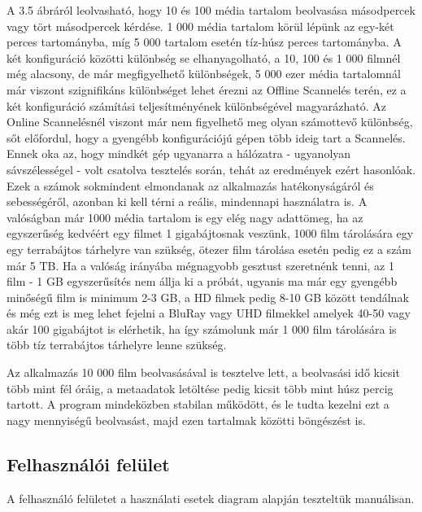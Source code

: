 A 3.5 ábráról leolvasható, hogy 10 és 100 média tartalom beolvasása másodpercek vagy tört másodpercek kérdése. 1 000 média tartalom körül lépünk az egy-két perces tartományba, míg 5 000 tartalom esetén tíz-húsz perces tartományba. A két konfiguráció közötti különbség se elhanyagolható, a 10, 100 és 1 000 filmnél még alacsony, de már megfigyelhető különbségek, 5 000 ezer média tartalomnál már viszont szignifikáns különbséget lehet érezni az Offline Scannelés terén, ez a két konfiguráció számítási teljesítményének különbségével magyarázható. Az Online Scannelésnél viszont már nem figyelhető meg olyan számottevő különbség, sőt előfordul, hogy a gyengébb konfigurációjú gépen több ideig tart a Scannelés. Ennek oka az, hogy mindkét gép ugyanarra a hálózatra - ugyanolyan sávszélességel - volt csatolva tesztelés során, tehát az eredmények ezért hasonlóak.
Ezek a számok sokmindent elmondanak az alkalmazás hatékonyságáról és sebességéről, azonban ki kell térni a reális, mindennapi használatra is. A valóságban már 1000 média tartalom is egy elég nagy adattömeg, ha az egyszerűség kedvéért egy filmet 1 gigabájtosnak veszünk, 1000 film tárolására egy egy terrabájtos tárhelyre van szükség, ötezer film tárolása esetén pedig ez a szám már 5 TB. Ha a valóság irányába mégnagyobb gesztust szeretnénk tenni, az 1 film - 1 GB egyszerűsítés nem állja ki a próbát, ugyanis ma már egy gyengébb minőségű film is minimum 2-3 GB, a HD filmek pedig 8-10 GB között tendálnak és még ezt is meg lehet fejelni a BluRay vagy UHD filmekkel amelyek 40-50 vagy akár 100 gigabájtot is elérhetik, ha így számolunk már 1 000 film tárolására is több tíz terrabájtos tárhelyre lenne szükség.

Az alkalmazás 10 000 film beolvasásával is tesztelve lett, a beolvasási idő kicsit több mint fél óráig, a metaadatok letöltése pedig kicsit több mint húsz percig tartott. A program mindeközben stabilan működött, és le tudta kezelni ezt a nagy mennyiségű beolvasást, majd ezen tartalmak közötti böngészést is.

\subsection{Felhasználói felület}
A felhasználó felületet a használati esetek diagram alapján teszteltük manuálisan.

